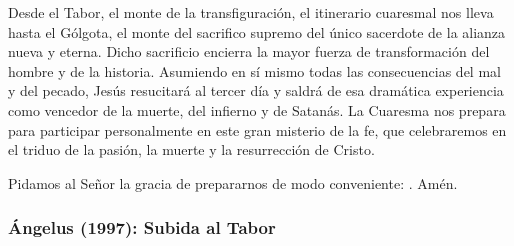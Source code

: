 \begin{body}
Desde el Tabor, el monte de la transfiguración, el itinerario cuaresmal nos lleva hasta el Gólgota, el monte del sacrifico supremo del único sacerdote de la alianza nueva y eterna. Dicho sacrificio encierra la mayor fuerza de transformación del hombre y de la historia. Asumiendo en sí mismo todas las consecuencias del mal y del pecado, Jesús resucitará al tercer día y saldrá de esa dramática experiencia como vencedor de la muerte, del infierno y de Satanás. La Cuaresma nos prepara para participar personalmente en este gran misterio de la fe, que celebraremos en el triduo de la pasión, la muerte y la resurrección de Cristo.

Pidamos al Señor la gracia de prepararnos de modo conveniente: . Amén.
\end{body}


\label{b2-03-02-1997A}
\newpage 


\subsubsection{Ángelus (1997): Subida al Tabor}


